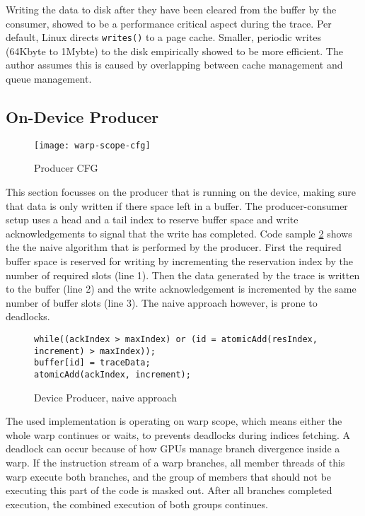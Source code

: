 	Writing the data to disk after they have been cleared from the buffer by the consumer, showed to be a performance critical aspect during the trace. Per default, Linux directs \verb|writes()| to a page cache. Smaller, periodic writes (64Kbyte to 1Mybte) to the disk empirically showed to be more efficient. The author assumes this is caused by overlapping between cache management and queue management.
	
	\subsection{On-Device Producer}\label{ondevprod}
\begin{figure}[t]
	\centering
	\texttt{[image: warp-scope-cfg]}
	\caption{Producer CFG}
\label{wscfg}
\end{figure}	
	This section focusses on the producer that is running on the device, making sure that data is only written if there space left
	in a buffer. The producer-consumer setup uses a head and a tail index to reserve buffer space and write acknowledgements to signal that the write has completed. Code sample \ref{prod-cons} shows the the naive algorithm that is performed by the producer. First the required buffer space is reserved for writing by incrementing the reservation index
	by the number of required slots (line 1). Then the data generated by the trace is
	written to the buffer (line 2) and the write acknowledgement is incremented by the same number of buffer slots (line 3). The naive approach however, is prone to deadlocks.
\begin{figure}
	\begin{lstlisting}[style=C]
while((ackIndex > maxIndex) or (id = atomicAdd(resIndex, increment) > maxIndex));
buffer[id] = traceData;
atomicAdd(ackIndex, increment);
\end{lstlisting}
	\caption{Device Producer, naive approach}
	\label{prod-cons}
\end{figure}

	
	The used implementation is operating on warp scope, which means either the whole warp continues or waits, to prevents deadlocks during indices fetching.
	A deadlock can occur because of how GPUs manage branch divergence inside a warp. If the instruction stream of a warp branches, all member threads of this warp execute both branches, and the group of members that should not be executing this part of the code is masked out. After all branches completed execution, the combined execution of both groups continues.
	
